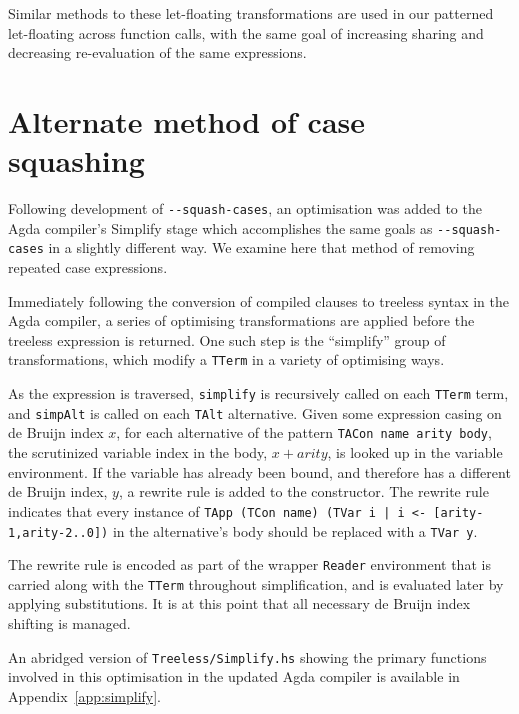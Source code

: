 Similar methods to these let-floating transformations are used in our patterned let-floating across function calls, with the same goal of increasing sharing and decreasing re-evaluation of the same expressions.

\section{Alternate method of case squashing}
\label{sub:alternate_case_squash}

Following development of \texttt{-{}-squash-cases}, an optimisation was added to the Agda compiler's Simplify stage which accomplishes the same goals as \texttt{-{}-squash-cases} in a slightly different way. We examine here that method of removing repeated case expressions.

Immediately following the conversion of compiled clauses to treeless syntax in the Agda compiler, a series of optimising transformations are applied before the treeless expression is returned. One such step is the ``simplify'' group of transformations, which modify a \lstinline{TTerm} in a variety of optimising ways.

As the expression is traversed, \lstinline{simplify} is recursively called on each \lstinline{TTerm} term, and \lstinline{simpAlt} is called on each \lstinline{TAlt} alternative. Given some expression casing on de Bruijn index $x$, for each alternative of the pattern \lstinline{TACon name arity body}, the scrutinized variable index in the body, $x + arity$, is looked up in the variable environment. If the variable has already been bound, and therefore has a different de Bruijn index, $y$, a rewrite rule is added to the constructor. The rewrite rule indicates that every instance of \lstinline{TApp (TCon name) (TVar i | i <- [arity-1,arity-2..0])} in the alternative's body should be replaced with a \lstinline{TVar y}.

The rewrite rule is encoded as part of the wrapper \lstinline{Reader} environment that is carried along with the \lstinline{TTerm} throughout simplification, and is evaluated later by applying substitutions. It is at this point that all necessary de Bruijn index shifting is managed.

An abridged version of \texttt{Treeless/Simplify.hs} showing the primary functions involved in this optimisation in the updated Agda compiler is available in Appendix~\ref{app:simplify}.
